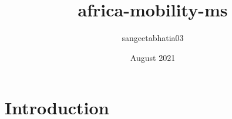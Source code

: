 \documentclass{article}
\title{africa-mobility-ms}
\author{sangeetabhatia03 }
\date{August 2021}
\begin{document}
\maketitle

\section{Introduction}
\end{document}

